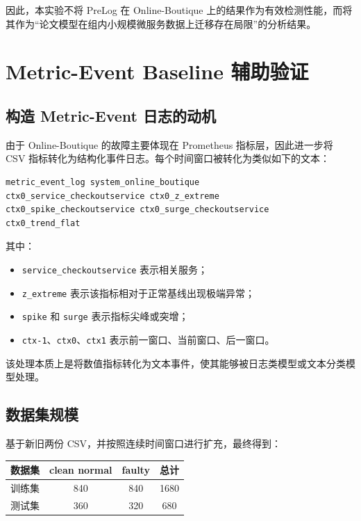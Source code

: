 \documentclass[UTF8,a4paper,12pt]{ctexart}
\begin{document}
因此，本实验不将 PreLog 在 Online-Boutique 上的结果作为有效检测性能，而将其作为“论文模型在组内小规模微服务数据上迁移存在局限”的分析结果。

\section{Metric-Event Baseline 辅助验证}

\subsection{构造 Metric-Event 日志的动机}

由于 Online-Boutique 的故障主要体现在 Prometheus 指标层，因此进一步将 CSV 指标转化为结构化事件日志。每个时间窗口被转化为类似如下的文本：

\begin{lstlisting}
metric_event_log system_online_boutique
ctx0_service_checkoutservice ctx0_z_extreme
ctx0_spike_checkoutservice ctx0_surge_checkoutservice
ctx0_trend_flat
\end{lstlisting}

其中：

\begin{itemize}
    \item \texttt{service\_checkoutservice} 表示相关服务；
    \item \texttt{z\_extreme} 表示该指标相对于正常基线出现极端异常；
    \item \texttt{spike} 和 \texttt{surge} 表示指标尖峰或突增；
    \item \texttt{ctx-1}、\texttt{ctx0}、\texttt{ctx1} 表示前一窗口、当前窗口、后一窗口。
\end{itemize}

该处理本质上是将数值指标转化为文本事件，使其能够被日志类模型或文本分类模型处理。

\subsection{数据集规模}

基于新旧两份 CSV，并按照连续时间窗口进行扩充，最终得到：

\begin{center}
\begin{tabular}{lccc}
\toprule
数据集 & clean normal & faulty & 总计 \\
\midrule
训练集 & 840 & 840 & 1680 \\
测试集 & 360 & 320 & 680 \\
\bottomrule
\end{tabular}
\end{center}
\end{document}
